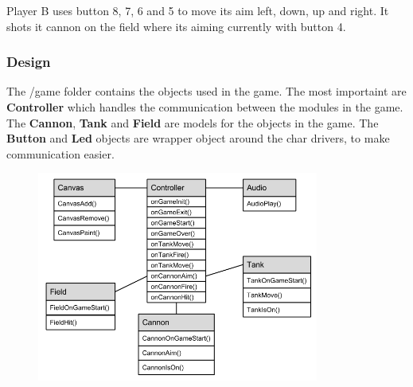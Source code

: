 Player B uses button 8, 7, 6 and 5 to move its aim left, down, up and right. It shots it cannon on
the field where its aiming currently with button 4.

\subsubsection{Design}

The /game folder contains the objects used in the game. The most importaint are {\bf Controller}
which handles the communication between the modules in the game. The {\bf Cannon}, {\bf Tank} and
{\bf Field} are models for the objects in the game. The {\bf Button} and {\bf Led} objects are
wrapper object around the char drivers, to make communication easier.

\begin{figure}[h]
  \includegraphics[width=350px]{graphics/game_UML.png}
\end{figure}
